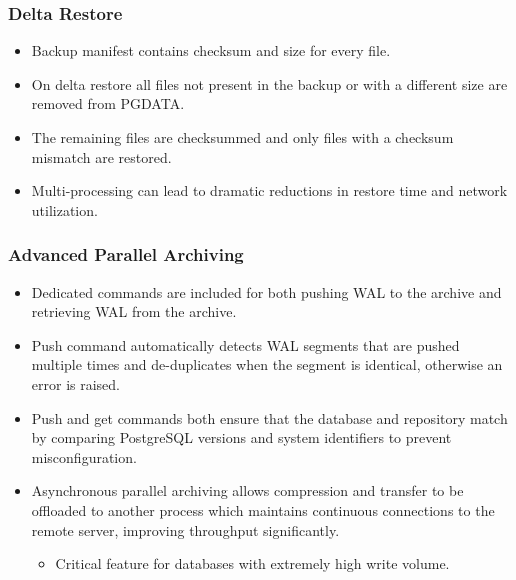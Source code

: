\begin{frame}
    \frametitle{Delta Restore}

    \begin{itemize}
        \item Backup manifest contains checksum and size for every file.\pause
        \item On delta restore all files not present in the backup or with a different size are removed from PGDATA.\pause
        \item The remaining files are checksummed and only files with a checksum mismatch are restored.\pause
        \item Multi-processing can lead to dramatic reductions in restore time and network utilization.
    \end{itemize}
\end{frame}

\begin{frame}
    \frametitle{Advanced Parallel Archiving}

    \begin{itemize}
        \item Dedicated commands are included for both pushing WAL to the archive and retrieving WAL from the archive.\pause
        \item Push command automatically detects WAL segments that are pushed multiple times and de-duplicates when the segment is identical, otherwise an error is raised.\pause
        \item Push and get commands both ensure that the database and repository match by comparing PostgreSQL versions and system identifiers to prevent misconfiguration.\pause

        \item Asynchronous parallel archiving allows compression and transfer to be offloaded to another process which maintains continuous connections to the remote server, improving throughput significantly.\pause

            \begin{itemize}
                \item Critical feature for databases with extremely high write volume.
            \end{itemize}
    \end{itemize}
\end{frame}


